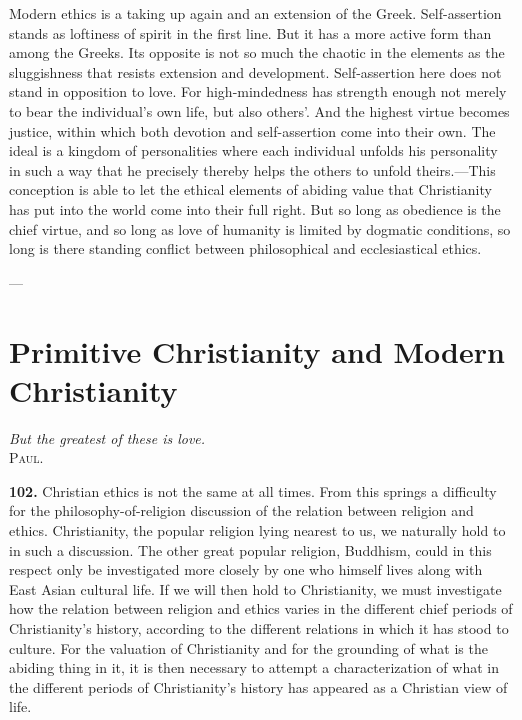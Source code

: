\documentclass[12pt,a4paper]{book}
\newcommand{\opage}[1]{\marginnote{\footnotesize\textit{[#1]}}}
\begin{document}
Modern ethics is a taking up again and an extension of the Greek. Self-assertion stands as loftiness of
spirit in the first line. But it has a more active form than among the Greeks. Its opposite is not so
much the chaotic in the elements as the sluggishness that resists extension and development.
Self-assertion here does not stand in opposition to love. For high-mindedness has strength enough not
merely to bear the individual's own life, but also others'. And the highest virtue becomes justice,
within which both devotion and self-assertion come into their own. The ideal is a kingdom of
personalities where each individual unfolds his personality in such a way that he precisely thereby 
\opage{228}helps
the others to unfold theirs.---This conception is able to let the ethical elements of abiding value that
Christianity has put into the world come into their full right. But so long as obedience is the chief
virtue, and so long as love of humanity is limited by dogmatic conditions, so long is there standing
conflict between philosophical and ecclesiastical ethics.

\begin{center}---\end{center}

\section{Primitive Christianity and Modern Christianity}
\label{sec:primitive-christianity}

\begin{flushright}
\opage{229}
\textit{But the greatest of these is love.}\\[2pt]
\textsc{Paul}.
\end{flushright}

\bigskip

\noindent\textbf{102.} Christian ethics is not the same at all times. From this springs a difficulty for
the philosophy-of-religion discussion of the relation between religion and ethics. Christianity, the
popular religion lying nearest to us, we naturally hold to in such a discussion. The other great popular
religion, Buddhism, could in this respect only be investigated more closely by one who himself lives
along with East Asian cultural life. If we will then hold to Christianity, we must investigate how the
relation between religion and ethics varies in the different chief periods of Christianity's history,
according to the different relations in which it has stood to culture. For the valuation of Christianity
and for the grounding of what is the abiding thing in it, it is then necessary to attempt a
characterization of what in the different periods of Christianity's history has appeared as a Christian
view of life.
\end{document}
